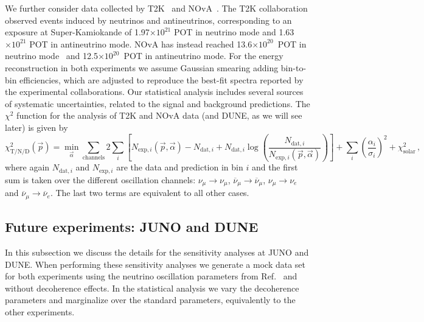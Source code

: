 \documentclass[aps, prd, onecolumn, tightenlines, notitlepage, superscriptaddress, nofootinbib, preprintnumbers, floatfix,showkeys,11pt]{revtex4-2}
\begin{document}
We further consider data collected by T2K~\cite{Abe:2021gky} and NOvA~\cite{NOvA:2021nfi}. The T2K collaboration observed events induced by neutrinos and antineutrinos, corresponding to an exposure at Super-Kamiokande of 1.97$\times10^{21}$ POT in neutrino mode and 1.63$\times10^{21}$ POT in antineutrino mode. 
%
NOvA has instead reached 13.6$\times10^{20}$~POT in neutrino mode~\cite{NOvA:2018gge} and 12.5$\times10^{20}$~POT in antineutrino mode.
%
For the energy reconstruction in both experiments we assume Gaussian smearing adding bin-to-bin efficiencies, which are adjusted to reproduce the best-fit spectra reported by the experimental collaborations.
%
Our statistical analysis includes  several sources of systematic uncertainties, related to the signal and background predictions. 
%
The $\chi^2$ function for the analysis of T2K and NOvA data (and DUNE, as we will see later) is given by
%
\begin{equation}
\label{eq:T2KNOvAchi2}
 \chi^2_{\mathrm{T/N/D}}(\vec{p})=\min_{\vec{\alpha}}
 \sum_\text{channels}2\sum_i \left[ N_{\text{exp},i}(\vec{p},\vec{\alpha})- N_{\text{dat},i} +
 N_{\text{dat},i} \log \left(\frac{N_{\text{dat},i}}{N_{\text{exp},i}(\vec{p},\vec{\alpha})}\right)\right] 
 + \sum_i \left(\frac{\alpha_i}{\sigma_i}\right)^2 + \chi^2_{\text{solar}}\,,
\end{equation}
where again $N_{\text{dat},i}$ and $N_{\text{exp},i}$ are the data and prediction in bin $i$ and the first sum is taken over the different oscillation channels: $\nu_{\mu}\to\nu_{\mu}$, $\overline{\nu}_{\mu}\to\overline{\nu}_{\mu}$, $\nu_{\mu}\to\nu_e$ and $\overline{\nu}_{\mu}\to\overline{\nu}_e$. The last two terms are equivalent to all other cases.

\subsection{Future experiments: JUNO and DUNE}
\label{sec:future_exps}

In this subsection we discuss the details for the sensitivity analyses at JUNO and DUNE. When performing these sensitivity analyses we generate a mock data set for both experiments using the neutrino oscillation parameters from Ref.~\cite{deSalas:2020pgw} and without decoherence effects. In the statistical analysis we vary the decoherence parameters and marginalize over the standard parameters, equivalently to the other experiments.
\end{document}
